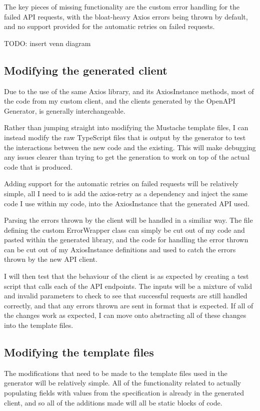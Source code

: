 The key pieces of missing functionality are the custom error handling for the failed API requests, with the bloat-heavy Axios errors being thrown by default, and no support provided for the automatic retries on failed requests.

TODO: insert venn diagram

\subsection{Modifying the generated client}
Due to the use of the same Axios library, and its AxiosInstance methods, most of the code from my custom client, and the clients generated by the OpenAPI Generator, is generally interchangeable.

Rather than jumping straight into modifying the Mustache template files, I can instead modify the raw TypeScript files that is output by the generator to test the interactions between the new code and the existing. This will make debugging any issues clearer than trying to get the generation to work on top of the actual code that is produced.

Adding support for the automatic retries on failed requests will be relatively simple, all I need to is add the axios-retry as a dependency and inject the same code I use within my code, into the AxiosInstance that the generated API used.

Parsing the errors thrown by the client will be handled in a similiar way. The file defining the custom ErrorWrapper class can simply be cut out of my code and pasted within the generated library, and the code for handling the error thrown can be cut out of my AxiosInstance definitions and used to catch the errors thrown by the new API client.

I will then test that the behaviour of the client is as expected by creating a test script that calls each of the API endpoints. The inputs will be a mixture of valid and invalid parameters to check to see that successful requests are still handled correctly, and that any errors thrown are sent in format that is expected. If all of the changes work as expected, I can move onto abstracting all of these changes into the template files.
\subsection{Modifying the template files}
The modifications that need to be made to the template files used in the generator will be relatively simple. All of the functionality related to actually populating fields with values from the specification is already in the generated client, and so all of the additions made will all be static blocks of code.

